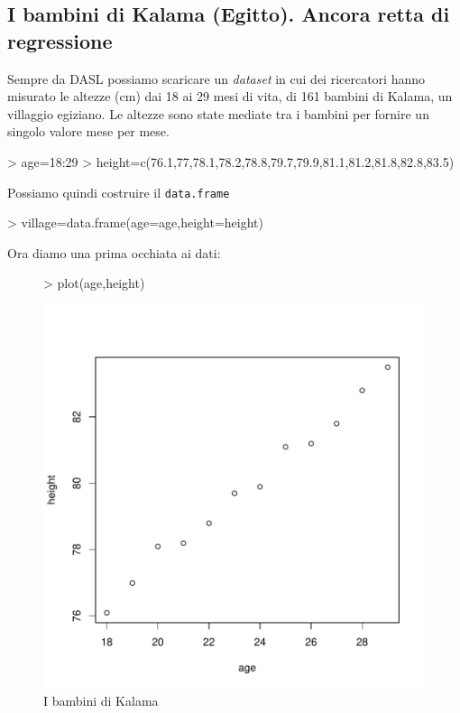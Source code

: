 \documentclass[onecolumn,11pt]{book}
\begin{document}
\subsection{I bambini di Kalama (Egitto). Ancora retta di regressione}
Sempre da DASL 
possiamo scaricare un \emph{dataset} in cui dei ricercatori hanno misurato le altezze (cm) dai 18 ai 29 mesi di vita, di 161 bambini di Kalama, un villaggio egiziano. Le altezze sono state mediate tra i bambini per fornire un singolo valore mese per mese. 
\begin{Schunk}
\begin{Sinput}
> age=18:29 
> height=c(76.1,77,78.1,78.2,78.8,79.7,79.9,81.1,81.2,81.8,82.8,83.5)
\end{Sinput}
\end{Schunk}
Possiamo quindi costruire il \texttt{data.frame}
\begin{Schunk}
\begin{Sinput}
> village=data.frame(age=age,height=height)
\end{Sinput}
\end{Schunk}
Ora diamo una prima occhiata ai dati:
\begin{figure}[htbp]
\begin{center}
\begin{Schunk}
\begin{Sinput}
> plot(age,height)
\end{Sinput}
\end{Schunk}
\includegraphics{statisticaconR-326}
\caption{I bambini di Kalama}
\label{kalama}
\end{center}
\end{figure}
\end{document}
